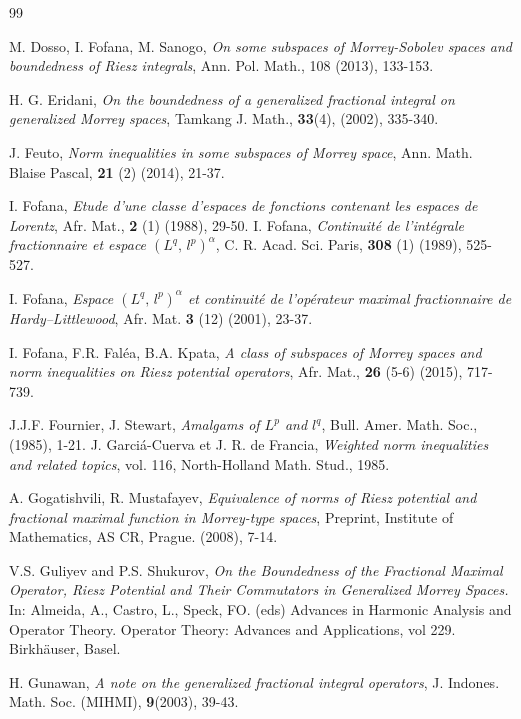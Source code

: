 \documentclass[a4paper,12pt,intlimits,oneside]{amsart}
\numberwithin{equation}{section}
\numberwithin{equation}{section}
\theoremstyle{definition}
\begin{document}
\begin{thebibliography}{99}

 M. Dosso, I. Fofana, M. Sanogo, \textit{On some subspaces of Morrey-Sobolev spaces and boundedness
of Riesz integrals}, Ann. Pol. Math., 108 (2013), 133-153.

 H. G. Eridani, \textit{On the boundedness of a generalized fractional integral on generalized Morrey
spaces}, Tamkang J. Math., \textbf{33}(4), (2002), 335-340.


 J. Feuto, \textit{Norm inequalities in some subspaces of Morrey space}, Ann. Math. Blaise Pascal, \textbf{21} (2) (2014), 21-37.


 I. Fofana, \textit{Etude d'une classe d'espaces de fonctions contenant les espaces de Lorentz}, Afr. Mat., \textbf{2} (1) (1988), 29-50.
 I. Fofana, \textit{Continuit\'{e} de l'int\'{e}grale fractionnaire et espace $(L^{q},\, l^{ p})^{\alpha}$}, C. R. Acad. Sci. Paris, \textbf{308} (1) (1989), 525-527.

 I. Fofana, \textit{Espace $(L^{q},\, l^{ p})^{\alpha}$ et continuit\'e de l'opérateur maximal fractionnaire de Hardy–Littlewood}, Afr. Mat. \textbf{3} (12) (2001), 23-37.

 I. Fofana, F.R. Fal\'ea, B.A. Kpata, \textit{A class of subspaces of Morrey spaces and norm inequalities on Riesz potential operators}, Afr. Mat., \textbf{26} (5-6) (2015), 717-739.

  J.J.F. Fournier, J. Stewart, \textit{Amalgams of $L^{p}$ and $l^{q}$}, Bull. Amer. Math. Soc.,  (1985), 1-21.
  J. Garci\'a-Cuerva et J. R. de Francia, \textit{Weighted norm inequalities and related topics}, vol. 116, North-Holland Math. Stud., 1985.

  A. Gogatishvili, R. Mustafayev, \textit{Equivalence of norms
  of Riesz potential and fractional maximal function in Morrey-type
  spaces}, Preprint, Institute of Mathematics, AS CR, Prague. (2008), 7-14.


 V.S. Guliyev and P.S. Shukurov, \textit{On the Boundedness of the Fractional Maximal Operator, Riesz Potential and Their Commutators in Generalized Morrey Spaces.} 
In: Almeida, A., Castro, L., Speck, FO. (eds) Advances in Harmonic Analysis and Operator Theory. Operator Theory: Advances and Applications, vol 229. Birkhäuser, Basel.

  H. Gunawan, \textit{A note on the generalized fractional integral operators}, J. Indones. Math. Soc. (MIHMI), \textbf{9}(2003), 39-43.



\end{thebibliography}
\end{document}
